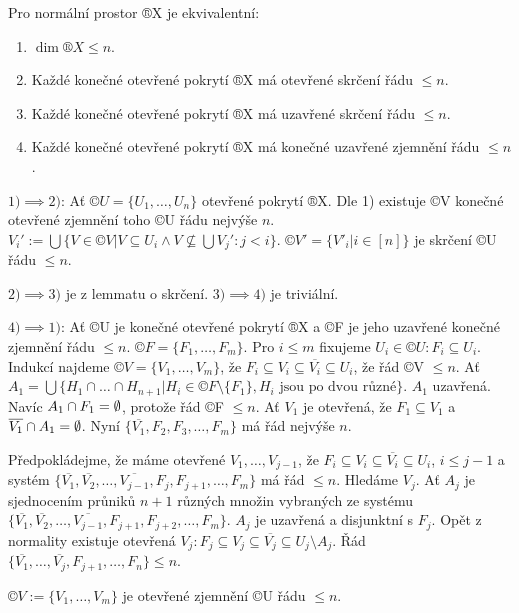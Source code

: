 \documentclass[12pt]{article}                   %
\begin{document}
    \begin{veta}
        Pro normální prostor ®X je ekvivalentní:
        
        \begin{enumerate}
            \item $\dim ®X ≤ n$.
            \item Každé konečné otevřené pokrytí ®X má otevřené skrčení řádu $≤ n$.
            \item Každé konečné otevřené pokrytí ®X má uzavřené skrčení řádu $≤ n$.
            \item Každé konečné otevřené pokrytí ®X má konečné uzavřené zjemnění řádu $≤ n$.
        \end{enumerate}

        \begin{dukazin}
            $1) \implies 2)$: Ať $©U = \{U_1, …, U_n\}$ otevřené pokrytí ®X. Dle 1) existuje ©V konečné otevřené zjemnění toho ©U řádu nejvýše $n$. $V_i' := \bigcup \{V \in ©V|V \subseteq U_i \land V \nsubseteq \bigcup V_j': j < i\}$. $©V' = \{V'_i | i \in [n]\}$ je skrčení ©U řádu $≤ n$.

            $2) \implies 3)$ je z lemmatu o skrčení. $3) \implies 4)$ je triviální.

            $4) \implies 1)$: Ať ©U je konečné otevřené pokrytí ®X a ©F je jeho uzavřené konečné zjemnění řádu $≤ n$. $©F = \{F_1, …, F_m\}$. Pro $i ≤ m$ fixujeme $U_i \in ©U: F_i \subseteq U_i$. Indukcí najdeme $©V = \{V_1, …, V_m\}$, že $F_i \subseteq V_i \subseteq \overline{V_i} \subseteq U_i$, že řád ©V $≤ n$. Ať $A_1 = \bigcup \{H_1 \cap … \cap  H_{n+1} | H_i \in ©F \setminus \{F_1\}, H_i \text{ jsou po dvou různé}\}$. $A_1$ uzavřená. Navíc $A_1 \cap F_1 = \emptyset$, protože řád ©F $≤ n$. Ať $V_1$ je otevřená, že $F_1 \subseteq V_1$ a $\overline{V_1} \cap A_1 = \emptyset$. Nyní $\{\overline{V_1}, F_2, F_3, …, F_m\}$ má řád nejvýše $n$.

            Předpokládejme, že máme otevřené $V_1, …, V_{j-1}$, že $F_i \subseteq V_i \subseteq \overline{V_i} \subseteq U_i$, $i ≤ j-1$ a systém $\{\overline{V_1}, \overline{V_2}, …, \overline{V_{j-1}}, F_j, F_{j+1}, …, F_m\}$ má řád $≤ n$. Hledáme $V_j$. Ať $A_j$ je sjednocením průniků $n+1$ různých množin vybraných ze systému $\{\overline{V_1}, \overline{V_2}, …, \overline{V_{j-1}}, F_{j+1}, F_{j+2}, …, F_m\}$. $A_j$ je uzavřená a disjunktní s $F_j$. Opět z normality existuje otevřená $V_j: F_j \subseteq V_j \subseteq \overline{V_j} \subseteq U_j \setminus A_j$. Řád $\{\overline{V_1}, …, \overline{V_j}, F_{j+1}, …, F_n\} ≤ n$.

            $©V:= \{V_1, …, V_m\}$ je otevřené zjemnění ©U řádu $≤ n$.
        \end{dukazin}
    \end{veta}
\end{document}
